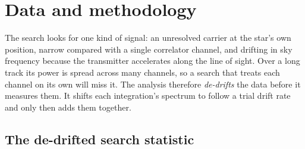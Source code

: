 \section{Data and methodology}
\label{sec:method}

The search looks for one kind of signal: an unresolved carrier at the star's
own position, narrow compared with a single correlator channel, and drifting in
sky frequency because the transmitter accelerates along the line of sight. Over
a long track its power is spread across many channels, so a search that treats
each channel on its own will miss it. The analysis therefore \emph{de-drifts}
the data before it measures them. It shifts each integration's spectrum to
follow a trial drift rate and only then adds them together.

\subsection{The de-drifted search statistic}
\label{sec:statistic}

